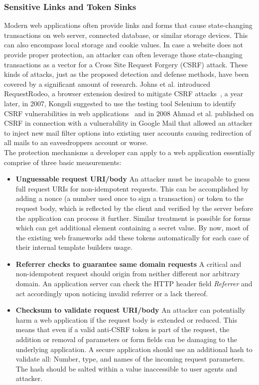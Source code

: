       \subsubsection{Sensitive Links and Token Sinks}
      \label{subsubsubsec:6.6.1.3.sensitive_links_and_token_sinks}

      Modern web applications often provide links and forms that cause state-changing transactions on web server, connected database, or similar storage devices. This can also encompass local storage and cookie values. In case a website does not provide proper protection, an attacker can often leverage those state-changing transactions as a vector for a Cross Site Request Forgery (CSRF) attack. These kinds of attacks, just as the proposed detection and defense methods, have been covered by a significant amount of research. Johns et al. introduced RequestRodeo, a browser extension desired to mitigate CSRF attacks~\cite{johns2006requestrodeo}, a year later, in 2007, Kongsli suggested to use the testing tool Selenium to identify CSRF vulnerabilities in web applications~\cite{kongsli2007security} and in 2008 Ahmad et al. published on CSRF in connection with a vulnerability in Google Mail that allowed an attacker to inject new mail filter options into existing user accounts causing redirection of all mails to an eavesdroppers account or worse.\\

      The protection mechanisms a developer can apply to a web application essentially comprise of three basic measurements:\\

      \begin{itemize}
	\item \textbf{Unguessable request URI/body} An attacker must be incapable to guess full request URIs for non-idempotent requests. This can be accomplished by adding a nonce (a number used once to sign a transaction) or token to the request body, which is reflected by the client and verified by the server before the application can process it further. Similar treatment is possible for forms which can get additional element containing a secret value. By now, most of the existing web frameworks add these tokens automatically for each case of their internal template builders usage.
	\item \textbf{Referrer checks to guarantee same domain requests} A critical and non-idempotent request should origin from neither different nor arbitrary domain. An application server can check the HTTP header field \textit{Referrer} and act accordingly upon noticing invalid referrer or a lack thereof.
	\item \textbf{Checksum to validate request URI/body} An attacker can potentially harm a web application if the request body is extended or reduced. This means that even if a valid anti-CSRF token is part of the request, the addition or removal of parameters or form fields can be damaging to the underlying application. A secure application should use an additional hash to validate all: Number, type, and names of the incoming request parameters. The hash should be salted within a value inaccessible to user agents and attacker. 
      \end{itemize}


